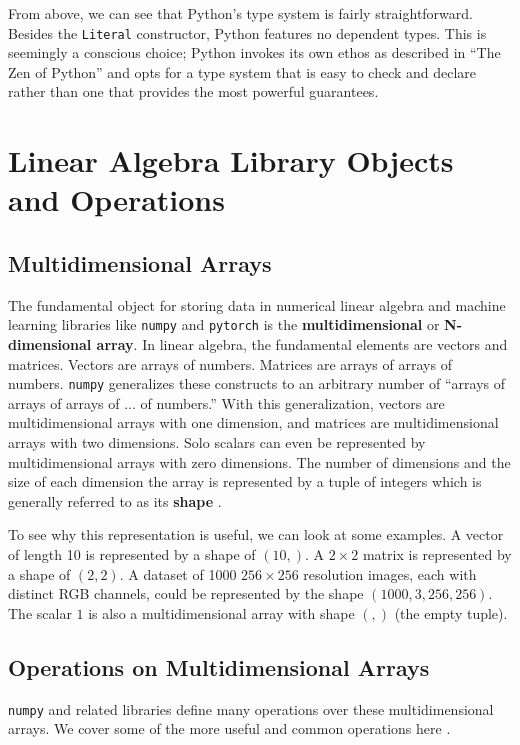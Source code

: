 \documentclass[12pt]{report}
\begin{document}
From above, we can see that Python's type system is fairly straightforward. Besides the \texttt{Literal} constructor, Python features no dependent types. This is seemingly a conscious choice; Python invokes its own ethos as described in ``The Zen of Python'' and opts for a type system that is easy to check and declare rather than one that provides the most powerful guarantees.

\section{Linear Algebra Library Objects and Operations}

\subsection{Multidimensional Arrays}
\label{multidimensional}

The fundamental object for storing data in numerical linear algebra and machine learning libraries like \texttt{numpy} and \texttt{pytorch} is the \textbf{multidimensional} or \textbf{N-dimensional array}. In linear algebra, the fundamental elements are vectors and matrices. Vectors are arrays of numbers. Matrices are arrays of arrays of numbers. \texttt{numpy} generalizes these constructs to an arbitrary number of ``arrays of arrays of arrays of ... of numbers.'' With this generalization, vectors are multidimensional arrays with one dimension, and matrices are multidimensional arrays with two dimensions. Solo scalars can even be represented by multidimensional arrays with zero dimensions. The number of dimensions and the size of each dimension the array is represented by a tuple of integers which is generally referred to as its \textbf{shape} \cite{ndarray}.

To see why this representation is useful, we can look at some examples. A vector of length 10 is represented by a shape of $(10,)$. A $2 \times 2$ matrix is represented by a shape of $(2, 2)$. A dataset of 1000 $256 \times 256$ resolution images, each with distinct RGB channels, could be represented by the shape $(1000, 3, 256, 256)$. The scalar $1$ is also a multidimensional array with shape $(,)$ (the empty tuple).

\subsection{Operations on Multidimensional Arrays}
\label{ndarray-operations}

\texttt{numpy} and related libraries define many operations over these multidimensional arrays. We cover some of the more useful and common operations here \cite{numpy-manual}.
\end{document}
